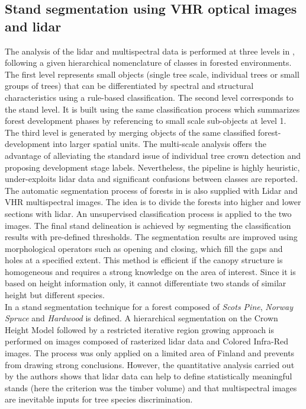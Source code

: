 \subsection{Stand segmentation using VHR optical images and lidar}
The analysis of the lidar and multispectral data is performed at three levels in \citep{tiede2004object}, following a given hierarchical nomenclature of classes in forested environments. The first level represents small objects (single tree scale, individual trees or small groups of trees) that can be differentiated by spectral and structural characteristics using a rule-based classification. The second level corresponds to the stand level. It is built using the same classification process which summarizes forest development phases by referencing to small scale sub-objects at level 1. The third level is generated by merging objects of the same classified forest-development into larger spatial units. The multi-scale analysis offers the advantage of alleviating the standard issue of individual tree crown detection and proposing development stage labels. Nevertheless, the pipeline is highly heuristic, under-exploits lidar data and significant confusions between classes are reported.\\

The automatic segmentation process of forests in \citep{diedershagen2004automatic} is also supplied with Lidar and VHR multispectral images. The idea is to divide the forests into higher and lower sections with lidar. An unsupervised classification process is applied to the two images. The final stand delineation is achieved by segmenting the classification results with pre-defined thresholds. The segmentation results are improved using morphological operators such as opening and closing, which fill the gaps and holes at a specified extent. This method is efficient if the canopy structure is homogeneous and requires a strong knowledge on the area of interest. Since it is based on height information only, it cannot differentiate two stands of similar height but different species.\\

In \citep{leppanen2008automatic} a stand segmentation technique for a forest composed of \textit{Scots Pine}, \textit{Norway Spruce} and \textit{Hardwood} is defined. A hierarchical segmentation on the Crown Height Model followed by a restricted iterative region growing approach is performed on images composed of rasterized lidar data and Colored Infra-Red images. The process was only applied on a limited area of Finland and prevents from drawing strong conclusions. However, the quantitative analysis carried out by the authors shows that lidar data can help to define statistically meaningful stands (here the criterion was the timber volume) and that multispectral images are inevitable inputs for tree species discrimination. \\


